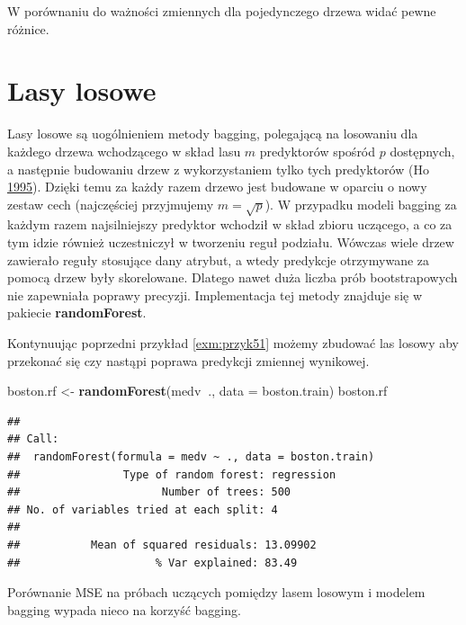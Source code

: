 \documentclass[]{book}
\newenvironment{Shaded}{\begin{snugshade}}{\end{snugshade}}
\newcommand{\DataTypeTok}[1]{\textcolor[rgb]{0.13,0.29,0.53}{#1}}
\newcommand{\KeywordTok}[1]{\textcolor[rgb]{0.13,0.29,0.53}{\textbf{#1}}}
\newcommand{\NormalTok}[1]{#1}
\newcommand{\OperatorTok}[1]{\textcolor[rgb]{0.81,0.36,0.00}{\textbf{#1}}}
\newcommand{\StringTok}[1]{\textcolor[rgb]{0.31,0.60,0.02}{#1}}
\theoremstyle{plain}
\theoremstyle{definition}
\theoremstyle{definition}
\theoremstyle{definition}
\theoremstyle{definition}
\theoremstyle{remark}
\let\BeginKnitrBlock\begin \let\EndKnitrBlock\end
\begin{document}
W porównaniu do ważności zmiennych dla pojedynczego drzewa widać pewne różnice.

\hypertarget{lasy-losowe}{%
\section{Lasy losowe}\label{lasy-losowe}}

Lasy losowe są uogólnieniem metody bagging, polegającą na losowaniu dla każdego drzewa wchodzącego w skład lasu \(m\) predyktorów spośród \(p\) dostępnych, a następnie budowaniu drzew z wykorzystaniem tylko tych predyktorów (Ho \protect\hyperlink{ref-ho1995}{1995}). Dzięki temu za każdy razem drzewo jest budowane w oparciu o nowy zestaw cech (najczęściej przyjmujemy \(m=\sqrt{p}\)). W przypadku modeli bagging za każdym razem najsilniejszy predyktor wchodził w skład zbioru uczącego, a co za tym idzie również uczestniczył w tworzeniu reguł podziału. Wówczas wiele drzew zawierało reguły stosujące dany atrybut, a wtedy predykcje otrzymywane za pomocą drzew były skorelowane. Dlatego nawet duża liczba prób bootstrapowych nie zapewniała poprawy precyzji. Implementacja tej metody znajduje się w pakiecie \textbf{randomForest}.

\BeginKnitrBlock{example}
\protect\hypertarget{exm:przyk52}{}{\label{exm:przyk52} }Kontynuując poprzedni przykład \ref{exm:przyk51} możemy zbudować las losowy aby przekonać się czy nastąpi poprawa predykcji zmiennej wynikowej.
\EndKnitrBlock{example}

\begin{Shaded}
\begin{Highlighting}[]
\NormalTok{boston.rf <-}\StringTok{ }\KeywordTok{randomForest}\NormalTok{(medv}\OperatorTok{~}\NormalTok{., }\DataTypeTok{data =}\NormalTok{ boston.train)}
\NormalTok{boston.rf}
\end{Highlighting}
\end{Shaded}

\begin{verbatim}
## 
## Call:
##  randomForest(formula = medv ~ ., data = boston.train) 
##                Type of random forest: regression
##                      Number of trees: 500
## No. of variables tried at each split: 4
## 
##           Mean of squared residuals: 13.09902
##                     % Var explained: 83.49
\end{verbatim}

Porównanie MSE na próbach uczących pomiędzy lasem losowym i modelem bagging wypada nieco na korzyść bagging.
\end{document}

